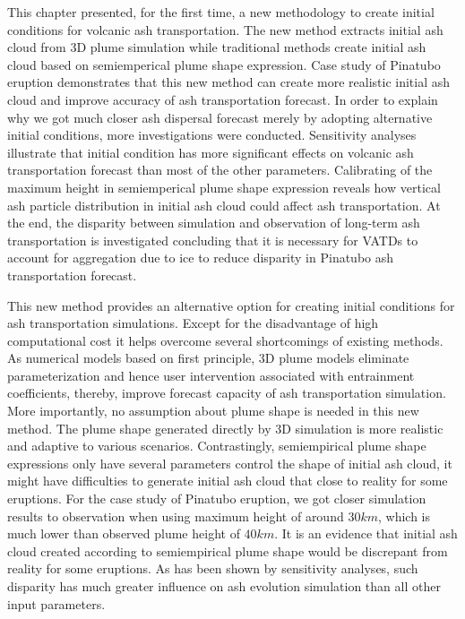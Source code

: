This chapter presented, for the first time, a new methodology to create initial conditions for volcanic ash transportation. The new method extracts initial ash cloud from 3D plume simulation while traditional methods create initial ash cloud based on semiemperical plume shape expression. Case study of Pinatubo eruption demonstrates that this new method can create more realistic initial ash cloud and improve accuracy of ash transportation forecast. In order to explain why we got much closer ash dispersal forecast merely by adopting alternative initial conditions, more investigations were conducted. Sensitivity analyses illustrate that initial condition has more significant effects on volcanic ash transportation forecast than most of the other parameters. Calibrating of the maximum height in semiemperical plume shape expression reveals how vertical ash particle distribution in initial ash cloud could affect ash transportation. At the end, the disparity between simulation and observation of long-term ash transportation is investigated concluding that it is necessary for VATDs to account for aggregation due to ice to reduce disparity in Pinatubo ash transportation forecast.

This new method provides an alternative option for creating initial conditions for ash transportation simulations. Except for the disadvantage of high computational cost it helps overcome several shortcomings of existing methods.
As numerical models based on first principle, 3D plume models eliminate parameterization and hence user intervention associated with entrainment coefficients, thereby, improve forecast capacity of ash transportation simulation. More importantly, no assumption about plume shape is needed in this new method. The plume shape generated directly by 3D simulation is more realistic and adaptive to various scenarios.
Contrastingly, semiempirical plume shape expressions only have several parameters control the shape of initial ash cloud, it might have difficulties to generate initial ash cloud that close to reality for some eruptions.
For the case study of Pinatubo eruption, we got closer simulation results to observation when using maximum height of around $30 km$, which is much lower than observed plume height of $40 km$. It is an evidence that initial ash cloud created according to semiempirical plume shape would be discrepant from reality for some eruptions. As has been shown by sensitivity analyses, such disparity has much greater influence on ash evolution simulation than all other input parameters.

